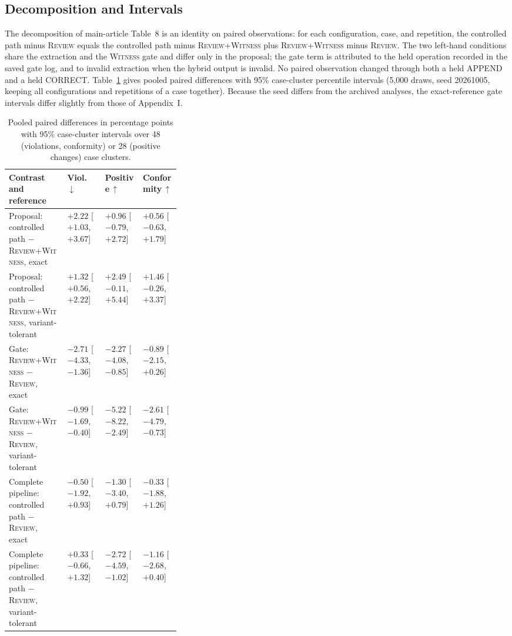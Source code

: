 \documentclass[acmsmall,review]{acmart}
\newcommand{\witness}{\textsc{Witness}}
\newcommand{\review}{\textsc{Review}}
\begin{document}
\subsection{Decomposition and Intervals}
The decomposition of main-article Table~8 is an identity on paired observations: for each configuration, case, and repetition, the controlled path minus \review{} equals the controlled path minus \review{}+\witness{} plus \review{}+\witness{} minus \review{}. The two left-hand conditions share the extraction and the \witness{} gate and differ only in the proposal; the gate term is attributed to the held operation recorded in the saved gate log, and to invalid extraction when the hybrid output is invalid. No paired observation changed through both a held APPEND and a held CORRECT. Table~\ref{tab:K4} gives pooled paired differences with 95\% case-cluster percentile intervals (5,000 draws, seed 20261005, keeping all configurations and repetitions of a case together). Because the seed differs from the archived analyses, the exact-reference gate intervals differ slightly from those of Appendix~I.

\begin{table}[H]
\centering
\caption{Pooled paired differences in percentage points with 95\% case-cluster intervals over 48 (violations, conformity) or 28 (positive changes) case clusters.}\label{tab:K4}
\footnotesize
\setlength{\tabcolsep}{3pt}
\begin{tabular}{@{}>{\raggedright\arraybackslash}p{0.34\linewidth}lll@{}}
\toprule
\textbf{Contrast and reference} & \textbf{Viol.\,$\downarrow$} & \textbf{Positive\,$\uparrow$} & \textbf{Conformity\,$\uparrow$} \\
\midrule
Proposal: controlled path $-$ \review{}+\witness{}, exact & $+2.22$ [$+1.03$, $+3.67$] & $+0.96$ [$-0.79$, $+2.72$] & $+0.56$ [$-0.63$, $+1.79$] \\
Proposal: controlled path $-$ \review{}+\witness{}, variant-tolerant & $+1.32$ [$+0.56$, $+2.22$] & $+2.49$ [$-0.11$, $+5.44$] & $+1.46$ [$-0.26$, $+3.37$] \\
Gate: \review{}+\witness{} $-$ \review{}, exact & $-2.71$ [$-4.33$, $-1.36$] & $-2.27$ [$-4.08$, $-0.85$] & $-0.89$ [$-2.15$, $+0.26$] \\
Gate: \review{}+\witness{} $-$ \review{}, variant-tolerant & $-0.99$ [$-1.69$, $-0.40$] & $-5.22$ [$-8.22$, $-2.49$] & $-2.61$ [$-4.79$, $-0.73$] \\
Complete pipeline: controlled path $-$ \review{}, exact & $-0.50$ [$-1.92$, $+0.93$] & $-1.30$ [$-3.40$, $+0.79$] & $-0.33$ [$-1.88$, $+1.26$] \\
Complete pipeline: controlled path $-$ \review{}, variant-tolerant & $+0.33$ [$-0.66$, $+1.32$] & $-2.72$ [$-4.59$, $-1.02$] & $-1.16$ [$-2.68$, $+0.40$] \\
\bottomrule
\end{tabular}
\end{table}
\FloatBarrier
\end{document}
